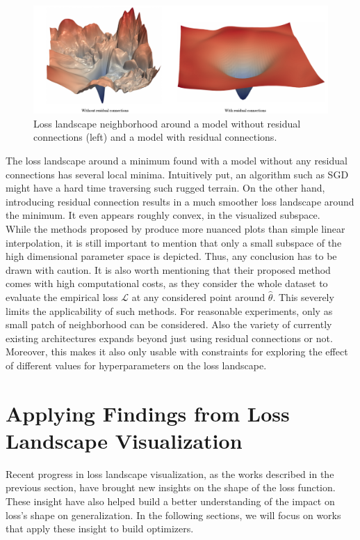 \documentclass[a4paper]{scrartcl}
\begin{document}
\begin{figure}[H]
	\centering
	\includegraphics[width=\linewidth]{figures/2dloss.pdf}
	\caption{Loss landscape neighborhood around a model without residual connections (left) and a model with residual connections.}
	\label{fig:2dloss}
\end{figure}
The loss landscape around a minimum found with a model without any residual connections has several local minima. Intuitively put, an algorithm such as SGD might have a hard time traversing such rugged terrain. On the other hand, introducing residual connection results in a much smoother loss landscape around the minimum. It even appears roughly convex, in the visualized subspace.\\
While the methods proposed by \cite{li2017visualizing} produce more nuanced plots than simple linear interpolation, it is still important to mention that only a small subspace of the high dimensional parameter space is depicted. Thus, any conclusion has to be drawn with caution. It is also worth mentioning that their proposed method comes with high computational costs, as they consider the whole dataset to evaluate the empirical loss $\mathcal{L}$ at any considered point around $\hat{\theta}$. This 
severely limits the applicability of such methods. For reasonable experiments, only as small patch of neighborhood can be considered. Also the variety of currently existing architectures expands beyond just using residual connections or not. Moreover, this makes it also only usable with constraints for exploring the effect of different values for hyperparameters on the loss landscape.









\section*{Applying Findings from Loss Landscape Visualization}
Recent progress in loss landscape visualization, as the works described in the previous section, have brought new insights on the shape of the loss function. These insight have also helped build a better understanding of the impact on loss's shape on generalization. In the following sections, we will focus on works that apply these insight to build optimizers.
\end{document}
